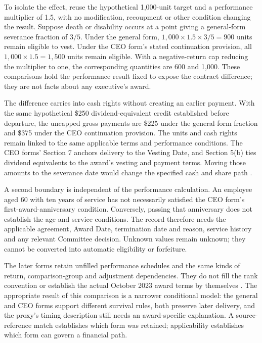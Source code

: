 To isolate the effect, reuse the hypothetical 1,000-unit target and a
performance multiplier of 1.5, with no modification, recoupment or other
condition changing the result. Suppose death or disability occurs at a point
giving a general-form severance fraction of $3/5$. Under the general form,
$1{,}000\times1.5\times3/5=900$ units remain eligible to vest. Under the
CEO form's stated continuation provision, all $1{,}000\times1.5=1{,}500$
units remain eligible. With a negative-return cap reducing the multiplier to
one, the corresponding quantities are 600 and 1,000. These comparisons
hold the performance result fixed to expose the contract difference; they
are not facts about any executive's award.

The difference carries into cash rights without creating an earlier payment.
With the same hypothetical \$250 dividend-equivalent credit established
before departure, the uncapped gross payments are \$225 under the
general-form fraction and \$375 under the CEO continuation provision. The
units and cash rights remain linked to the same applicable terms and
performance conditions. The CEO forms' Section 7 anchors delivery to the
Vesting Date, and Section 5(b) ties dividend equivalents to the award's
vesting and payment terms. Moving those amounts to the severance date would
change the specified cash and share path
\citep[Exhibit 10.2, Sections 5(b), 7--8]{apple2023q1awards}
\citep[Exhibits 10.20 and 10.22, Sections 5(b), 7--8]{apple2024}.

A second boundary is independent of the performance calculation. An employee
aged 60 with ten years of service has not necessarily satisfied the CEO
form's first-award-anniversary condition. Conversely, passing that anniversary
does not establish the age and service conditions. The record therefore needs
the applicable agreement, Award Date, termination date and reason, service
history and any relevant Committee decision. Unknown values remain unknown;
they cannot be converted into automatic eligibility or forfeiture.

The later forms retain unfilled performance schedules and the same kinds of
return, comparison-group and adjustment dependencies. They do not fill the
rank convention or establish the actual October 2023 award terms by
themselves \citep[Exhibits 10.20 and 10.22, Exhibit A]{apple2024}. The
appropriate result of this comparison is a narrower conditional model: the
general and CEO forms support different survival rules, both preserve later
delivery, and the proxy's timing description still needs an award-specific
explanation. A source-reference match establishes which form was retained;
applicability establishes which form can govern a financial path.
